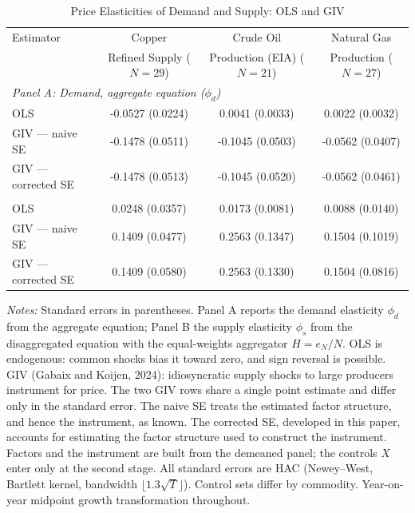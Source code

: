 
\begin{table}[htbp]
\centering
\caption{Price Elasticities of Demand and Supply: OLS and GIV}
\label{tab:elasticity}
\footnotesize
\setlength{\tabcolsep}{4pt}
\begin{tabular}{lccc}
\toprule
Estimator & Copper & Crude Oil & Natural Gas \\
  & Refined Supply ($N=29$) & Production (EIA) ($N=21$) & Production ($N=27$) \\
\midrule
\multicolumn{4}{l}{\textit{Panel A: Demand, aggregate equation ($\phi_d$)}} \\
\quad OLS & -0.0527 (0.0224) & 0.0041 (0.0033) & 0.0022 (0.0032) \\
\quad GIV --- naive SE & -0.1478 (0.0511) & -0.1045 (0.0503) & -0.0562 (0.0407) \\
\quad GIV --- corrected SE & -0.1478 (0.0513) & -0.1045 (0.0520) & -0.0562 (0.0461) \\
\addlinespace
\multicolumn{4}{l}{\textit{Panel B: Supply, disaggregated equation ($\phi_s$)}} \\
\quad OLS & 0.0248 (0.0357) & 0.0173 (0.0081) & 0.0088 (0.0140) \\
\quad GIV --- naive SE & 0.1409 (0.0477) & 0.2563 (0.1347) & 0.1504 (0.1019) \\
\quad GIV --- corrected SE & 0.1409 (0.0580) & 0.2563 (0.1330) & 0.1504 (0.0816) \\
\bottomrule
\end{tabular}

\vspace{4pt}
\raggedright\footnotesize
\textit{Notes:} Standard errors in parentheses. Panel A reports the demand elasticity $\phi_d$ from the aggregate equation; Panel B the supply elasticity $\phi_s$ from the disaggregated equation with the equal-weights aggregator $H = e_N/N$. OLS is endogenous: common shocks bias it toward zero, and sign reversal is possible. GIV (Gabaix and Koijen, 2024): idiosyncratic supply shocks to large producers instrument for price. The two GIV rows share a single point estimate and differ only in the standard error. The naive SE treats the estimated factor structure, and hence the instrument, as known. The corrected SE, developed in this paper, accounts for estimating the factor structure used to construct the instrument. Factors and the instrument are built from the demeaned panel; the controls $X$ enter only at the second stage. All standard errors are HAC (Newey--West, Bartlett kernel, bandwidth $\lfloor 1.3\sqrt{T}\rfloor$). Control sets differ by commodity. Year-on-year midpoint growth transformation throughout.
\end{table}
